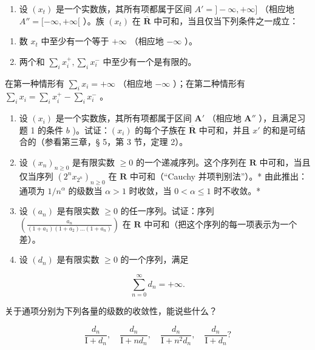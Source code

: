 \BourbakiExerciseGroup

\begin{enumerate}
\def\labelenumi{\arabic{enumi})}
\tightlist
\item
设 \((x_{t})\) 是一个实数族，其所有项都属于区间 \(A' = ] - \infty, +\infty]\) （相应地 \(A'' = [-\infty, +\infty[\) ）。族 \((x_{t})\) 在 \(\overline{\mathbf{R}}\) 中可和，当且仅当下列条件之一成立：
\end{enumerate}

\begin{enumerate}
\def\labelenumi{\alph{enumi})}
\item
数 \(x_{t}\) 中至少有一个等于 \(+\infty\) （相应地 \(-\infty\) ）。
\item
两个和 \(\sum_{i} x_{i}^{+}, \sum_{i} x_{i}^{-}\) 中至少有一个是有限的。
\end{enumerate}

在第一种情形有 \(\sum_{i} x_{i} = +\infty\) （相应地 \(-\infty\) ）；在第二种情形有 \(\sum_{i} x_{i} = \sum_{i} x_{i}^{+} - \sum_{i} x_{i}^{-}\) 。

\begin{enumerate}
\def\labelenumi{\arabic{enumi})}
\setcounter{enumi}{1}
\item
设 \((x_{i})\) 是一个实数族，其所有项都属于区间 \(\mathbf{A}'\) （相应地 \(\mathbf{A}''\) ），且满足习题 1 的条件 \(b\) )。试证：\((x_{i})\) 的每个子族在 \(\overline{\mathbf{R}}\) 中可和，并且 \(x'\) 的和是可结合的（参看第三章，§ 5，第 3 节，定理 2）。
\item
设 \((x_{n})_{n\geqslant 0}\) 是有限实数 \(\geqslant 0\) 的一个递减序列。这个序列在 \(\mathbf{R}\) 中可和，当且仅当序列 \((2^{n}x_{2^{n}})_{n\geqslant 0}\) 在 \(\mathbf{R}\) 中可和（``Cauchy 并项判别法''）。* 由此推出：通项为 \(1 / n^{\alpha}\) 的级数当 \(\alpha >1\) 时收敛，当 \(0 < \alpha \leqslant 1\) 时不收敛。*
\item
设 \((a_{n})\) 是有限实数 \(\geqslant 0\) 的任一序列。试证：序列 \(\left(\frac{a_n}{(1 + a_1)(1 + a_2)\ldots(1 + a_n)}\right)\) 在 \(\mathbf{R}\) 中可和（把这个序列的每一项表示为一个差）。
\item
设 \((d_n)\) 是有限实数 \(\geqslant 0\) 的一个序列，满足
\end{enumerate}

\[
\sum_ {n = 0} ^ {\infty} d _ {n} = + \infty .
\]

关于通项分别为下列各量的级数的收敛性，能说些什么？

\[
\frac {d _ {n}}{\mathrm{I} + d _ {n}}, \quad \frac {d _ {n}}{\mathrm{I} + n d _ {n}}, \quad \frac {d _ {n}}{\mathrm{I} + n ^ {2} d _ {n}}, \quad \frac {d _ {n}}{\mathrm{I} + d _ {n}}?
\]

